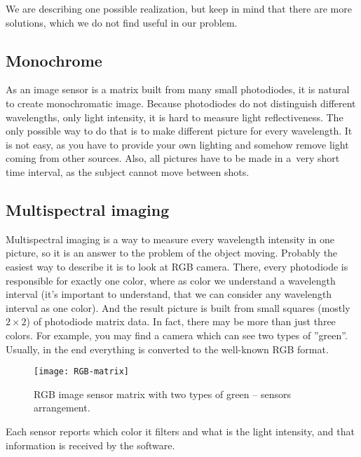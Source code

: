         We are describing one possible realization, but keep in mind that
        there are more solutions, which we do not find useful in our problem.

        \subsection*{Monochrome}
            As an image sensor is a matrix built from many small photodiodes,
            it is natural to create monochromatic image.
            Because photodiodes do not distinguish different
            wavelengths, only light intensity, it is hard
            to measure light reflectiveness.
            The only possible way to do that is to
            make different picture for every wavelength.
            It is not easy, as you have to
            provide your own lighting and somehow remove
            light coming from other sources.
            Also, all pictures have to be made in
            a~very short time interval, as the subject
            cannot move between shots.

        \subsection*{Multispectral imaging}
            Multispectral imaging is a way to measure every wavelength intensity
            in one picture, so it is an answer to the problem of the object moving.
            Probably the easiest way to describe it is to look at RGB camera.
            There, every photodiode is responsible for exactly one color,
            where as color we understand a wavelength interval (it's important
            to understand, that we can consider any wavelength interval as one color).
            And the result picture is built from small squares (mostly $2 \times 2$)
            of photodiode matrix data.
            In fact, there may be more than just three colors.
            For example, you may find a camera which can see two types of ''green''.
            Usually, in the end everything is converted to the well-known RGB format.

            \begin{figure}[H]
                \caption{RGB image sensor matrix with two types of green -- sensors arrangement.}
                \centering
                \texttt{[image: RGB-matrix]}
                \label{fig:RGB-matrix}
            \end{figure}

            Each sensor reports which color it filters and what is the light intensity,
            and that information is received by the software.

